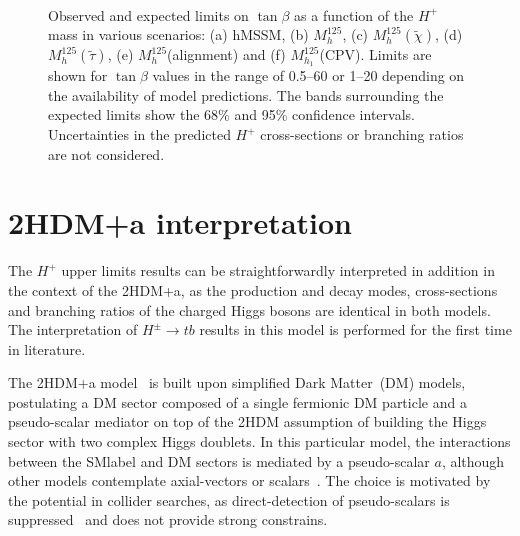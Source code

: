 \begin{figure}[htb]
    \RawFloats
    \centering
        \\
        \\
        \\
    \caption{Observed and expected limits on $\tan\beta$ as a function of the $H^+$ mass in various scenarios: 
    (a) hMSSM, (b) $M_h^{125}$, (c) $M_h^{125}(\tilde{\chi})$, (d) $M_h^{125}(\tilde\tau)$, (e) $M_h^{125}$(alignment) and (f) $M_{h_1}^{125}$(CPV). 
    Limits are shown for $\tan\beta$ values in the range of 0.5--60 or 1--20 depending on the availability of model predictions. The bands surrounding the expected limits show the 68\% and 95\% confidence intervals.
    Uncertainties in the predicted $H^+$ cross-sections or branching ratios are not considered.}
    \label{Hplustb:exclusionstanb}
\end{figure}

\section{2HDM+a interpretation}

The $H^+$ upper limits results can be straightforwardly interpreted in addition in the context of the 2HDM+a, as the production and decay modes, cross-sections and branching ratios of the charged Higgs bosons are identical in both models. The interpretation of $H^\pm\to tb$ results in this model is performed for the first time in literature.

The 2HDM+a model~\cite{Bauer_2017,10.48550/arxiv.1810.09420} is built upon simplified Dark Matter~(DM) models, postulating a DM sector composed of a single fermionic DM particle and a pseudo-scalar mediator on top of the 2HDM assumption of building the Higgs sector with two complex Higgs doublets. In this particular model, the interactions between the \acrshort{SMlabel} and DM sectors is mediated by a pseudo-scalar $a$, although other models contemplate axial-vectors or scalars~\cite{Abercrombie_2020,10.48550/arxiv.1603.04156,10.48550/arxiv.1703.05703}. The choice is motivated by the potential in collider searches, as direct-detection of pseudo-scalars is suppressed~\cite{Abe_2019} and does not provide strong constrains.

